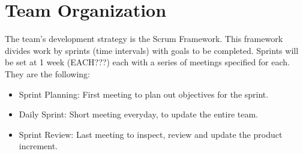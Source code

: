 \section{Team Organization}
	The team’s development strategy is the Scrum Framework. This framework
	divides work by sprints (time intervals) with goals to be completed. Sprints will be set at 1 week (EACH???)
	each with a series of meetings specified for each. They are the following:

	\begin{itemize}
		\item Sprint Planning: First meeting to plan out objectives for the sprint.
		\item Daily Sprint: Short meeting everyday, to update the entire team.
		\item Sprint Review: Last meeting to inspect, review and update the product increment.
	\end{itemize}


